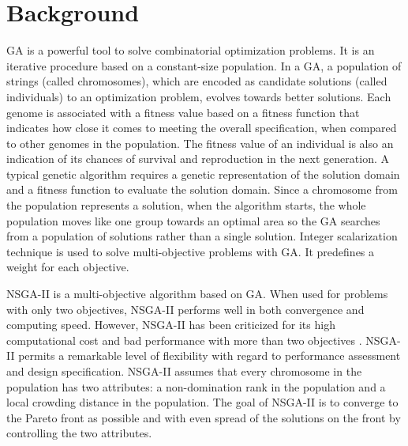 \documentclass{llncs}
\begin{document}
\section{Background}
\label{sec:Background}
GA \cite{man1996genetic} is a powerful tool to solve combinatorial optimization problems. It is an iterative procedure based on a constant-size population. In a GA, a population of strings (called chromosomes), 
which are encoded as candidate solutions (called individuals) to an optimization problem, evolves towards better solutions. 
Each genome is associated with a fitness value based on a fitness function that indicates how close it comes to meeting the overall specification, when compared to other genomes in the
population. The fitness value of an individual is also an indication of its chances of survival and reproduction in the next generation. A typical genetic algorithm requires a genetic
representation of the solution domain and a fitness function to evaluate the solution domain. Since a chromosome from the population represents a solution, when the algorithm starts, 
the whole population moves like one group towards an optimal area so the GA searches from a population of solutions rather than a single solution. Integer scalarization technique \cite{Multiobjective} is 
used to solve multi-objective problems with GA. It predefines a weight for each objective.

NSGA-II is a multi-objective algorithm based on GA. When used for problems with only two objectives, NSGA-II performs 
well in both convergence and  computing speed. However, NSGA-II has been
criticized for its high computational cost and bad performance with
more than two objectives \cite{nsga2_cri}. NSGA-II permits a remarkable level of flexibility with regard to 
performance assessment and design specification. NSGA-II assumes that every chromosome in the population has two 
attributes: a non-domination rank in the population and a local crowding distance in the population. The goal of 
NSGA-II is to converge to the Pareto front as possible and with even spread of the solutions on the front by 
controlling the two attributes. 
\end{document}
